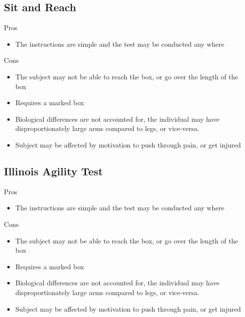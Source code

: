 \documentclass[12pt]{article}
\begin{document}
\subsection*{Sit and Reach}

\begin{minipage}[t]{0.5\textwidth}
    \begin{center}Pros\end{center}
    \begin{itemize}
        \item The instructions are simple and the test may be conducted any where
    \end{itemize}
\end{minipage}
\begin{minipage}[t]{0.5\textwidth}
    \begin{center}Cons\end{center}
    \begin{itemize}
        \item The subject may not be able to reach the box, or go over the length of the box
        \item Requires a marked box
        \item Biological differences are not accounted for, the individual may have disproportionately large arms compared to legs, or vice-versa.
        \item Subject may be affected by motivation to push through pain, or get injured
    \end{itemize}
\end{minipage}

\subsection*{Illinois Agility Test}

\begin{minipage}[t]{0.5\textwidth}
    \begin{center}Pros\end{center}
    \begin{itemize}
        \item The instructions are simple and the test may be conducted any where
    \end{itemize}
\end{minipage}
\begin{minipage}[t]{0.5\textwidth}
    \begin{center}Cons\end{center}
    \begin{itemize}
        \item The subject may not be able to reach the box, or go over the length of the box
        \item Requires a marked box
        \item Biological differences are not accounted for, the individual may have disproportionately large arms compared to legs, or vice-versa.
        \item Subject may be affected by motivation to push through pain, or get injured
    \end{itemize}
\end{minipage}
\end{document}
